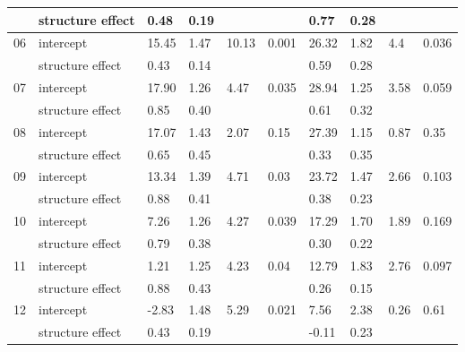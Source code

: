 \documentclass{article}
\begin{document}
\begin{table}[ht]
\begin{tabular}{|p{}|p{}|p{}p{}p{}p{}|p{}p{}p{}p{}|}
    & structure effect & 0.48 & 0.19 &  &  & 0.77 & 0.28 &  &  \\ 
   \hline
06 & intercept & 15.45 & 1.47 & 10.13 & 0.001 & 26.32 & 1.82 & 4.4 & 0.036 \\ 
    & structure effect & 0.43 & 0.14 &  &  & 0.59 & 0.28 &  &  \\ 
   \hline
07 & intercept & 17.90 & 1.26 & 4.47 & 0.035 & 28.94 & 1.25 & 3.58 & 0.059 \\ 
    & structure effect & 0.85 & 0.40 &  &  & 0.61 & 0.32 &  &  \\ 
   \hline
08 & intercept & 17.07 & 1.43 & 2.07 & 0.15 & 27.39 & 1.15 & 0.87 & 0.35 \\ 
    & structure effect & 0.65 & 0.45 &  &  & 0.33 & 0.35 &  &  \\ 
   \hline
09 & intercept & 13.34 & 1.39 & 4.71 & 0.03 & 23.72 & 1.47 & 2.66 & 0.103 \\ 
    & structure effect & 0.88 & 0.41 &  &  & 0.38 & 0.23 &  &  \\ 
   \hline
10 & intercept & 7.26 & 1.26 & 4.27 & 0.039 & 17.29 & 1.70 & 1.89 & 0.169 \\ 
    & structure effect & 0.79 & 0.38 &  &  & 0.30 & 0.22 &  &  \\ 
   \hline
11 & intercept & 1.21 & 1.25 & 4.23 & 0.04 & 12.79 & 1.83 & 2.76 & 0.097 \\ 
    & structure effect & 0.88 & 0.43 &  &  & 0.26 & 0.15 &  &  \\ 
   \hline
12 & intercept & -2.83 & 1.48 & 5.29 & 0.021 & 7.56 & 2.38 & 0.26 & 0.61 \\ 
    & structure effect & 0.43 & 0.19 &  &  & -0.11 & 0.23 &  &  \\ 
   \hline
\end{tabular}
\end{table}\clearpage
\end{document}
